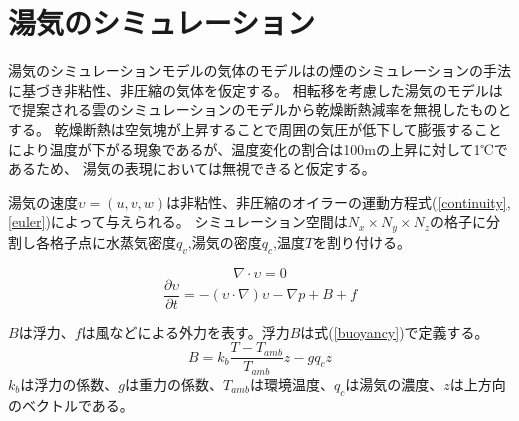 \section{湯気のシミュレーション}

湯気のシミュレーションモデルの気体のモデルは\cite{Fedkiw2001}の煙のシミュレーションの手法に基づき非粘性、非圧縮の気体を仮定する。
相転移を考慮した湯気のモデルは\cite{Miyazaki2002}\cite{Dobashi2008}で提案される雲のシミュレーションのモデルから乾燥断熱減率を無視したものとする。
乾燥断熱は空気塊が上昇することで周囲の気圧が低下して膨張することにより温度が下がる現象であるが、温度変化の割合は100mの上昇に対して1℃であるため、
湯気の表現においては無視できると仮定する。

湯気の速度$\upsilon=(u,v,w)$は非粘性、非圧縮のオイラーの運動方程式(\ref{continuity},\ref{euler})によって与えられる。
シミュレーション空間は$N_{x} \times N_{y} \times N_{z}$の格子に分割し各格子点に水蒸気密度$q_{v}$,湯気の密度$q_{c}$,温度$T$を割り付ける。

\begin{equation}
\label{continuity}
\nabla \cdot \upsilon = 0
\end{equation}
\begin{equation}
\label{euler}
\frac{\partial \upsilon}{\partial t} = -(\upsilon \cdot \nabla)\upsilon - \nabla p + B + f
\end{equation}

$B$は浮力、$f$は風などによる外力を表す。浮力$B$は式(\ref{buoyancy})で定義する。
\begin{equation}
\label{buoyancy}
B=k_{b}\frac{T-T_{amb}}{T_{amb}}z-gq_{c}z
\end{equation}
$k_{b}$は浮力の係数、$g$は重力の係数、$T_{amb}$は環境温度、$q_{c}$は湯気の濃度、$z$は上方向のベクトルである。

